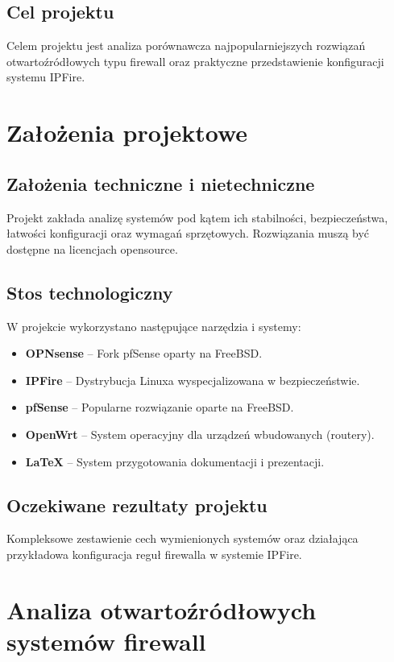 \documentclass[12pt,a4paper]{article}
\begin{document}
\subsection{Cel projektu}
Celem projektu jest analiza porównawcza najpopularniejszych rozwiązań otwartoźródłowych typu firewall oraz praktyczne przedstawienie konfiguracji systemu IPFire.





\newpage
\section{Założenia projektowe}
\subsection{Założenia techniczne i nietechniczne}
Projekt zakłada analizę systemów pod kątem ich stabilności, bezpieczeństwa, łatwości konfiguracji oraz wymagań sprzętowych. Rozwiązania muszą być dostępne na licencjach opensource.

\subsection{Stos technologiczny}
W projekcie wykorzystano następujące narzędzia i systemy:
\begin{itemize}
	\item \textbf{OPNsense} – Fork pfSense oparty na FreeBSD.
	\item \textbf{IPFire} – Dystrybucja Linuxa wyspecjalizowana w bezpieczeństwie.
	\item \textbf{pfSense} – Popularne rozwiązanie oparte na FreeBSD.
	\item \textbf{OpenWrt} – System operacyjny dla urządzeń wbudowanych (routery).
	\item \textbf{LaTeX} – System przygotowania dokumentacji i prezentacji.
\end{itemize}

\subsection{Oczekiwane rezultaty projektu}
Kompleksowe zestawienie cech wymienionych systemów oraz działająca przykładowa konfiguracja reguł firewalla w systemie IPFire.





\newpage
\section{Analiza otwartoźródłowych systemów firewall}
\end{document}
